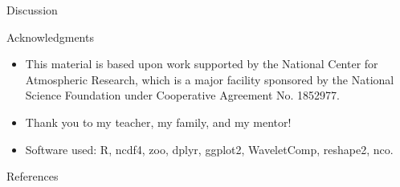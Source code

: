 \documentclass{beamer}
\begin{document}
\begin{frame}{Discussion}

\end{frame}

\begin{frame}{Acknowledgments}
  \begin{itemize}
  \item This material is based upon work supported by the National Center for Atmospheric Research, which is a major facility sponsored by the National Science Foundation under Cooperative Agreement No. 1852977.
  \item Thank you to my teacher, my family, and my mentor!
  \item Software used: R, ncdf4, zoo, dplyr, ggplot2, WaveletComp, reshape2, nco.
  \end{itemize}
\end{frame}

\begin{frame}{References}
  
  \fontsize{4pt}{5}\selectfont
  
\end{frame}
\end{document}
